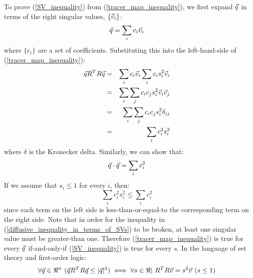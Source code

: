 \documentclass{article}
\begin{document}
To prove (\ref{SV_inequality}) from (\ref{tracer_map_inequality}), we first
expand $\vec q$ in terms of the right singular values, 
$\lbrace \vec v_i \rbrace$:
\begin{equation}
	\vec q = \sum_i c_i \vec v_i
\end{equation}
where $\lbrace c_i \rbrace$ are a set of coefficients.
Substituting this into the left-hand-side of (\ref{tracer_map_inequality}):
\begin{eqnarray}
	\vec q R^T R \vec q & = & \sum_i c_i \vec v_i \sum_i c_i s_i^2 \vec v_i \\
   & = & \sum_i \sum_j c_i c_j s_i^2 \vec v_i \vec v_j \\
   & = & \sum_i \sum_j c_i c_j s_i^2 \delta_{ij} \\
	  & = & \sum_i c_i^2 s_i^2
\end{eqnarray}
where $\delta$ is the Kronecker delta.
Similarly, we can show that:
\begin{equation}
	\vec q \cdot \vec q = \sum_i c_i^2
\end{equation}
If we assume that $s_i \le 1$ for every $i$, then:
\begin{equation}
	\sum_i c_i^2 s_i^2 \le \sum_i c_i^2 
	\label{diffusive_inequality_in_terms_of_SVs}
\end{equation}
since each term on the left side is less-than-or-equal-to the
corresponding term on the right side. 
Note that in order for the inequality in 
(\ref{diffusive_inequality_in_terms_of_SVs}) to be broken, at least one
singular value must be greater-than one.
Therefore (\ref{tracer_map_inequality}) is true for every $\vec q$
if-and-only-if (\ref{SV_inequality}) is true for every $s$.
In the language of set theory and first-order logic:
\begin{equation}
	\forall \vec q \in \Re^n ~ (\vec q R^T R \vec q \le |\vec q |^2) \iff \forall s \in \Re | ~R^T R \vec v = s^2 \vec v ~ (s \le 1)
	\label{theorem}
\end{equation}
\end{document}
